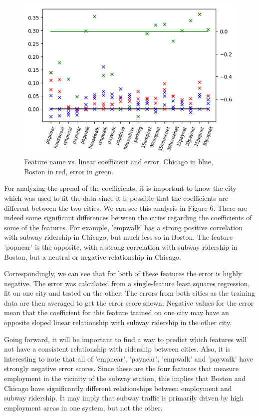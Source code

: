 \documentclass{article}
\begin{document}
\begin{figure}[H]\label{fig:f6}
\begin{center}\includegraphics[scale=1]{coef_by_city}\end{center}
\caption{Feature name vs. linear coefficient and error. Chicago in blue, Boston in red, error in green.}
\end{figure}

For analyzing the spread of the coefficients, it is important to know the city which was used to fit the data since it is possible that the coefficients are different between the two cities. We can see this analysis in Figure 6. There are indeed some significant differences between the cities regarding the coefficients of some of the features. For example, 'empwalk' has a strong positive correlation with subway ridership in Chicago, but much less so in Boston. The feature 'popnear' is the opposite, with a strong correlation with subway ridership in Boston, but a neutral or negative relationship in Chicago. 

Correspondingly, we can see that for both of these features the error is highly negative. The error was calculated from a single-feature least squares regression, fit on one city and tested on the other. The errors from both cities as the training data are then averaged to get the error score shown. Negative values for the error mean that the coefficient for this feature trained on one city may have an opposite sloped linear relationship with subway ridership in the other city.

Going forward, it will be important to find a way to predict which features will not have a consistent relationship with ridership between cities. Also, it is interesting to note that all of 'empnear', 'paynear', 'empwalk' and 'paywalk' have strongly negative error scores. Since these are the four features that measure employment in the vicinity of the subway station, this implies that Boston and Chicago have significantly different relationships between employment and subway ridership. It may imply that subway traffic is primarily driven by high employment areas in one system, but not the other. 
\end{document}
